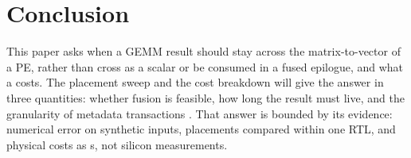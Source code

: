 
\section{Conclusion}\label{sec:conclusion}

%
This paper asks when a GEMM result should stay \blockscaled across the matrix-to-vector \handoff of a PE, rather than cross as a scalar or be consumed in a fused epilogue, and what a \failvisible \handoff costs.
The placement sweep and the cost breakdown will give the answer in three quantities: whether fusion is feasible, how long the result must live, and the granularity of metadata transactions .
That answer is bounded by its evidence: numerical error on synthetic inputs, placements compared within one RTL, and physical costs as \evPostRoute{}s, not silicon measurements.
